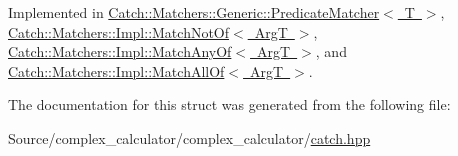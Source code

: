 Implemented in \mbox{\hyperlink{class_catch_1_1_matchers_1_1_generic_1_1_predicate_matcher_a2ec0e8ec19c4c5e26271d59a06a62b52}{Catch\+::\+Matchers\+::\+Generic\+::\+Predicate\+Matcher$<$ T $>$}}, \mbox{\hyperlink{struct_catch_1_1_matchers_1_1_impl_1_1_match_not_of_a181d693c0258e582d80dc6117a1f2b66}{Catch\+::\+Matchers\+::\+Impl\+::\+Match\+Not\+Of$<$ Arg\+T $>$}}, \mbox{\hyperlink{struct_catch_1_1_matchers_1_1_impl_1_1_match_any_of_a8a3e8338f979e56277dcf553efb78dc0}{Catch\+::\+Matchers\+::\+Impl\+::\+Match\+Any\+Of$<$ Arg\+T $>$}}, and \mbox{\hyperlink{struct_catch_1_1_matchers_1_1_impl_1_1_match_all_of_acfb377bda2c58ae62e6df9c3a8a89f8f}{Catch\+::\+Matchers\+::\+Impl\+::\+Match\+All\+Of$<$ Arg\+T $>$}}.



The documentation for this struct was generated from the following file\+:\begin{DoxyCompactItemize}
\item 
Source/complex\+\_\+calculator/complex\+\_\+calculator/\mbox{\hyperlink{catch_8hpp}{catch.\+hpp}}\end{DoxyCompactItemize}
